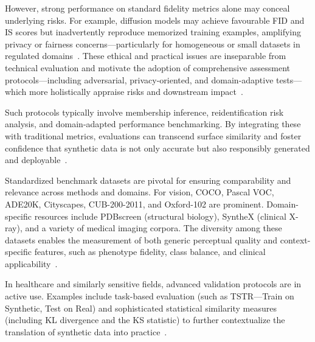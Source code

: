 \documentclass[sigconf]{acmart}
\begin{document}
However, strong performance on standard fidelity metrics alone may conceal underlying risks. For example, diffusion models may achieve favourable FID and IS scores but inadvertently reproduce memorized training examples, amplifying privacy or fairness concerns—particularly for homogeneous or small datasets in regulated domains~\cite{ref21}\cite{ref87}\cite{ref95}. These ethical and practical issues are inseparable from technical evaluation and motivate the adoption of comprehensive assessment protocols—including adversarial, privacy-oriented, and domain-adaptive tests—which more holistically appraise risks and downstream impact~\cite{ref87}\cite{ref88}\cite{ref3}.

Such protocols typically involve membership inference, reidentification risk analysis, and domain-adapted performance benchmarking. By integrating these with traditional metrics, evaluations can transcend surface similarity and foster confidence that synthetic data is not only accurate but also responsibly generated and deployable~\cite{ref88}\cite{ref89}.

Standardized benchmark datasets are pivotal for ensuring comparability and relevance across methods and domains. For vision, COCO, Pascal VOC, ADE20K, Cityscapes, CUB-200-2011, and Oxford-102 are prominent. Domain-specific resources include PDBscreen (structural biology), SyntheX (clinical X-ray), and a variety of medical imaging corpora. The diversity among these datasets enables the measurement of both generic perceptual quality and context-specific features, such as phenotype fidelity, class balance, and clinical applicability~\cite{ref31}\cite{ref34}\cite{ref43}\cite{ref79}\cite{ref81}.

In healthcare and similarly sensitive fields, advanced validation protocols are in active use. Examples include task-based evaluation (such as TSTR—Train on Synthetic, Test on Real) and sophisticated statistical similarity measures (including KL divergence and the KS statistic) to further contextualize the translation of synthetic data into practice~\cite{ref1}\cite{ref87}\cite{ref88}\cite{ref89}. 
\end{document}
